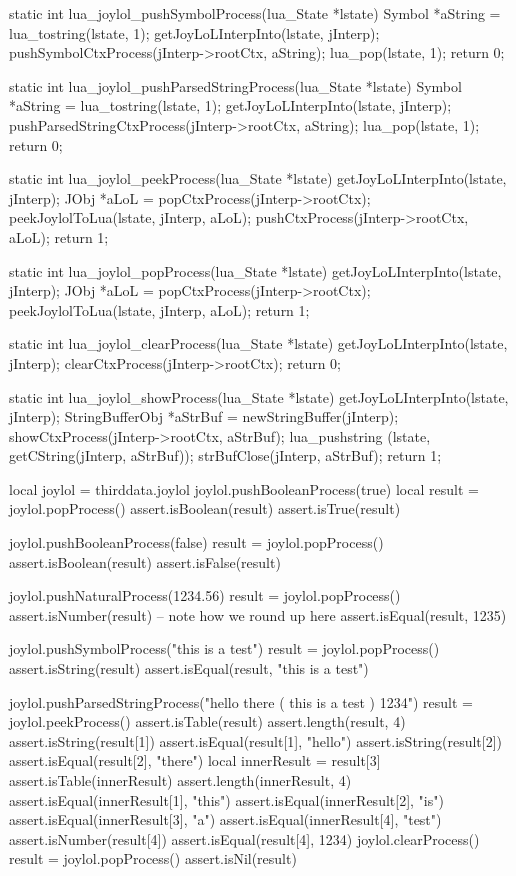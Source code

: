 static int lua_joylol_pushSymbolProcess(lua_State *lstate) {
  Symbol *aString = lua_tostring(lstate, 1);
  getJoyLoLInterpInto(lstate, jInterp);
  pushSymbolCtxProcess(jInterp->rootCtx, aString);
  lua_pop(lstate, 1);
  return 0;
}

static int lua_joylol_pushParsedStringProcess(lua_State *lstate) {
  Symbol *aString = lua_tostring(lstate, 1);
  getJoyLoLInterpInto(lstate, jInterp);
  pushParsedStringCtxProcess(jInterp->rootCtx, aString);
  lua_pop(lstate, 1);
  return 0;
}

static int lua_joylol_peekProcess(lua_State *lstate) {
  getJoyLoLInterpInto(lstate, jInterp);
  JObj *aLoL = popCtxProcess(jInterp->rootCtx);
  peekJoylolToLua(lstate, jInterp, aLoL);
  pushCtxProcess(jInterp->rootCtx, aLoL);
  return 1;
}

static int lua_joylol_popProcess(lua_State *lstate) {
  getJoyLoLInterpInto(lstate, jInterp);
  JObj *aLoL = popCtxProcess(jInterp->rootCtx);
  peekJoylolToLua(lstate, jInterp, aLoL);
  return 1;
}

static int lua_joylol_clearProcess(lua_State *lstate) {
  getJoyLoLInterpInto(lstate, jInterp);
  clearCtxProcess(jInterp->rootCtx);
  return 0;
}

static int lua_joylol_showProcess(lua_State *lstate) {
  getJoyLoLInterpInto(lstate, jInterp);
  StringBufferObj *aStrBuf = newStringBuffer(jInterp);
  showCtxProcess(jInterp->rootCtx, aStrBuf);
  lua_pushstring (lstate, getCString(jInterp, aStrBuf));
  strBufClose(jInterp, aStrBuf);
  return 1;
}
\stopCCode

\startLuaTest
  local joylol = thirddata.joylol
  joylol.pushBooleanProcess(true)
  local result = joylol.popProcess()
  assert.isBoolean(result)
  assert.isTrue(result)
  
  joylol.pushBooleanProcess(false)
  result = joylol.popProcess()
  assert.isBoolean(result)
  assert.isFalse(result)
  
  joylol.pushNaturalProcess(1234.56)
  result = joylol.popProcess()
  assert.isNumber(result)
  -- note how we round up here
  assert.isEqual(result, 1235)
  
  joylol.pushSymbolProcess("this is a test")
  result = joylol.popProcess()
  assert.isString(result)
  assert.isEqual(result, "this is a test")

  joylol.pushParsedStringProcess("hello there ( this is a test ) 1234")
  result = joylol.peekProcess()
  assert.isTable(result)
  assert.length(result, 4)
  assert.isString(result[1])
  assert.isEqual(result[1], "hello")
  assert.isString(result[2])
  assert.isEqual(result[2], "there")
  local innerResult = result[3]
  assert.isTable(innerResult)
  assert.length(innerResult, 4)
  assert.isEqual(innerResult[1], "this")
  assert.isEqual(innerResult[2], "is")
  assert.isEqual(innerResult[3], "a")
  assert.isEqual(innerResult[4], "test")
  assert.isNumber(result[4])
  assert.isEqual(result[4], 1234)
  joylol.clearProcess()
  result = joylol.popProcess()
  assert.isNil(result)
\stopLuaTest
\stopTestCase
\stopTestSuite

